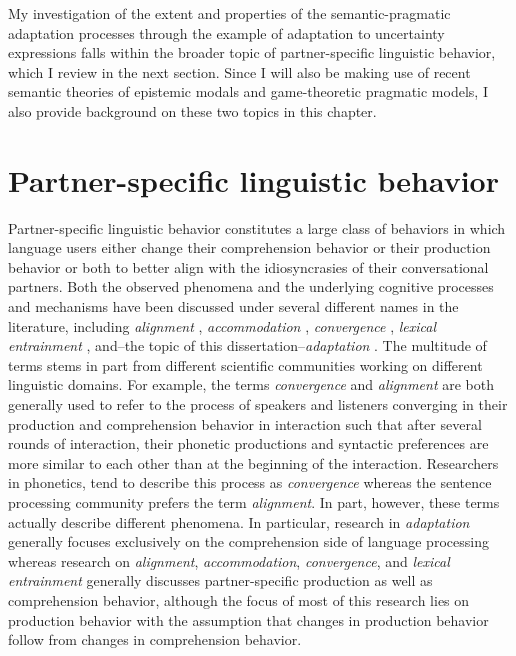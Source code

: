 My investigation of the extent and properties of the semantic-pragmatic adaptation processes through the example of adaptation to uncertainty expressions  falls within the broader topic of partner-specific linguistic behavior, which I review in the next section. Since I will also be making use of recent semantic theories of epistemic
modals and game-theoretic pragmatic models, I also provide background on these two topics in this chapter.

\section{Partner-specific linguistic behavior}

Partner-specific linguistic behavior constitutes a large class of behaviors in which language users either change their comprehension behavior or their production behavior or both to better align with the idiosyncrasies of their conversational partners. Both the observed phenomena and the underlying cognitive processes and mechanisms have been discussed under several different names in the literature, including \textit{alignment} , \textit{accommodation} , \textit{convergence} , \textit{lexical entrainment} , and--the topic of this dissertation--\textit{adaptation} . The multitude of terms stems in part from different scientific communities working on different linguistic domains. For example, the terms \textit{convergence} and \textit{alignment} 
are both generally used to refer to the process of speakers and listeners converging in their production and comprehension behavior in interaction such that after several rounds of interaction, 
their phonetic productions and syntactic preferences are more similar to each other than at the beginning of the interaction. Researchers in phonetics, tend to describe this process as \textit{convergence} 
whereas the sentence processing community prefers the term \textit{alignment}. In part, however, these terms actually describe different phenomena. In particular, research in \textit{adaptation} generally focuses exclusively
on the comprehension side of language processing whereas research on \textit{alignment}, \textit{accommodation}, \textit{convergence}, and \textit{lexical entrainment} generally discusses partner-specific production as well as comprehension behavior, although the focus of most of this research lies on production behavior with the assumption that changes in production behavior follow from changes in comprehension behavior.

